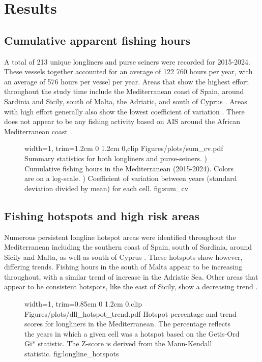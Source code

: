 \chapter{Results}
\section{Cumulative apparent fishing hours}
A total of 213 unique longliners and purse seiners were recorded for 2015-2024. These vessels
together accounted for an average of 122 760 hours per year, with an average of 576 hours per
vessel per year. Areas that show the highest effort throughout the study time include the
Mediterranean coast of Spain, around Sardinia and Sicily, south of Malta, the Adriatic, and south
of Cyprus . Areas with high effort generally also show the lowest
coefficient of variation . There does not appear to be any fishing activity
based on AIS around the African Mediterranean coast .

\medskip

\begin{figure}[ht]
	{width=1\linewidth, trim=1.2cm 0 1.2cm 0,clip}
	{Figures/plots/sum_cv.pdf}
	{%
		Summary statistics for both longliners and purse-seiners. ) Cumulative fishing hours in the Mediterranean (2015-2024).
		Colors are on a log-scale. ) Coefficient of variation between years (standard deviation divided by mean) for each cell.
	}{fig:sum_cv}
\end{figure}

\FloatBarrier
\section{Fishing hotspots and high risk areas}
Numerous persistent longline hotspot areas were identified throughout the Mediterranean including
the southern coast of Spain, south of Sardinia, around Sicily and Malta, as well as south of Cyprus
. These hotspots show however, differing trends. Fishing hours
in the south of Malta appear to be increasing throughout, with a similar trend of increase in the
Adriatic Sea. Other areas that appear to be consistent hotspots, like the east of Sicily, show a
decreasing trend .

\begin{figure}[H]
	{width=1\linewidth, trim=0.85cm 0 1.2cm 0,clip}
	{Figures/plots/dll_hotspot_trend.pdf}
	{%
		Hotspot percentage and trend scores for longliners in the Mediterranean.
		The percentage reflects the years in which a given cell was a hotspot based on the Getis-Ord Gi* statistic.
		The Z-score is derived from the Mann-Kendall statistic.}
	{fig:longline_hotspots}
\end{figure}

